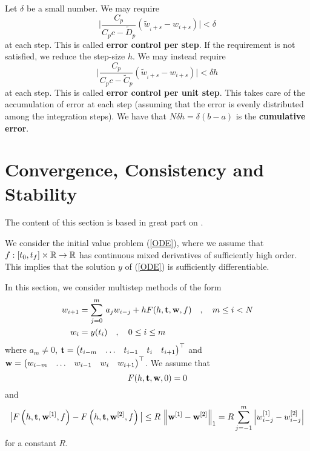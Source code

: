Let $\delta$ be a small number.  We may require
\[
\bigg| \frac{\displaystyle C_p}{\displaystyle C_pc-\tilde{D}_p}
\left( \tilde{w}_{_i+s} - w_{i+s} \right)  \bigg| < \delta
\]
at each step.  This is called
{\bfseries error control per step}.  If the requirement is not satisfied, we reduce the
step-size $h$.  We may instead require
\[
\bigg| \frac{\displaystyle C_p}{\displaystyle C_pc-\tilde{C}_p}
\left( \tilde{w}_{_i+s} - w_{i+s} \right)  \bigg| < \delta h
\]
at each step.  This is called
{\bfseries error control per unit step}.
This takes care of the accumulation of error at each step (assuming
that the error is evenly distributed among the integration steps).
We have that $N\delta h = \delta (b-a)$ is the
{\bfseries cumulative error}.

\section{Convergence, Consistency and Stability}\label{CCSyuk}

The content of this section is based in great part on \cite{I,IK}.

We consider the initial value problem (\ref{ODE}), where 
we assume that $f:[t_0,t_f]\times \mathbb{R} \rightarrow \mathbb{R}$ has continuous mixed
derivatives of sufficiently high order.  This
implies that the solution $y$ of (\ref{ODE}) is sufficiently
differentiable.

In this section, we consider multistep methods of the form
\begin{equation} \label{MSM_GF}
\begin{split}
w_{i+1} &= \sum_{j=0}^m\,a_jw_{i-j} + h F(h,\mathbf{t},\mathbf{w},f)
\quad, \quad m \leq i < N \\
w_i &= y(t_i) \quad, \quad 0 \leq i \leq m
\end{split}
\end{equation}
where $a_m \neq 0$,
$\mathbf{t}
=\begin{pmatrix} t_{i-m} & \ldots & t_{i-1} & t_i & t_{i+1} \end{pmatrix}^\top$
and 
$\mathbf{w}
=\begin{pmatrix} w_{i-m} & \ldots & w_{i-1} & w_i & w_{i+1} \end{pmatrix}^\top$.
We assume that
\begin{equation} \label{Fzero}
F(h,\mathbf{t},\mathbf{w},0) = 0
\end{equation}
and
\begin{equation} \label{FDP_Lip}
\big| F\left(h,\mathbf{t}, \mathbf{w}^{[1]},f\right) -
F\left(h,\mathbf{t},\mathbf{w}^{[2]},f\right) \big|
\leq R\,\left\|\mathbf{w}^{[1]} -\mathbf{w}^{[2]} \right\|_1
= R \sum_{j=-1}^m \left|w_{i-j}^{[1]}-w_{i-j}^{[2]}\right|
\end{equation}
for a constant $R$.

